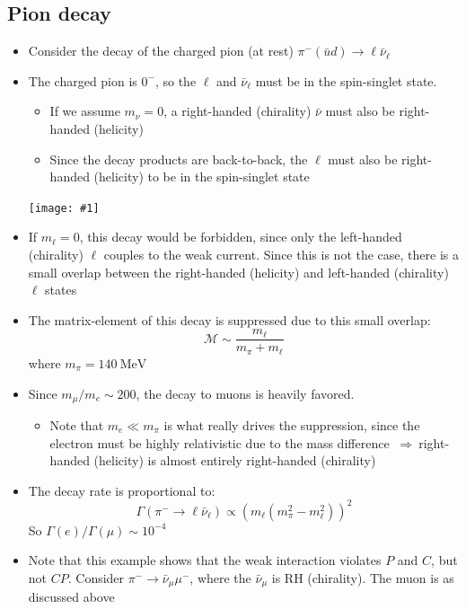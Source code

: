 \documentclass[11pt]{article}
\newcommand{\ubar}{\bar{u}}
\newcommand{\nubar}{{\bar{\nu}}}
\newcommand{\Mme}{\mathcal{M}}
\newcommand{\mev}{\text{MeV}}
\newcommand{\thus}{$~\Rightarrow~$}
\newcommand{\embedimgw}[2]{\begin{center}\texttt{[image: \#1]}\end{center}}
\begin{document}
\subsection{Pion decay}
\begin{itemize}
  \item Consider the decay of the charged pion (at rest) $\pi^-(\ubar d)\rightarrow \ell \nubar_\ell$
  \item The charged pion is $0^-$, so the $\ell$ and $\nubar_\ell$ must be in the spin-singlet state. 
  \begin{itemize}
    \item If we assume $m_\nu = 0$, a right-handed (chirality) $\nubar$ must also be right-handed (helicity)
    \item Since the decay products are back-to-back, the $\ell$ must also be right-handed (helicity) to be in the spin-singlet state
  \end{itemize}
  \embedimgw{figs/piondecay.png}{.6}
  \item If $m_\ell = 0$, this decay would be forbidden, since only the left-handed (chirality) $\ell$ couples to the weak current. Since this is not the case, there is a small overlap between the right-handed (helicity) and left-handed (chirality) $\ell$ states
  \item The matrix-element of this decay is suppressed due to this small overlap:
  \begin{equation}
    \Mme \sim \frac{m_\ell}{m_\pi + m_\ell}
  \end{equation}
  where $m_\pi = 140~\mev$
  \item Since $m_\mu/m_e \sim 200$, the decay to muons is heavily favored.
  \begin{itemize}
    \item Note that $m_e \ll m_\pi$ is what really drives the suppression, since the electron must be highly relativistic due to the mass difference \thus right-handed (helicity) is almost entirely right-handed (chirality)
  \end{itemize}
  \item The decay rate is proportional to:
  \begin{equation}
    \Gamma (\pi^- \rightarrow \ell \nubar_\ell) \propto \left(m_\ell \left(m_\pi^2 - m_\ell^2\right) \right)^2
  \end{equation}
  So $\Gamma(e)/\Gamma(\mu) \sim 10^{-4}$
  \item Note that this example shows that the weak interaction violates $P$ and $C$, but not $CP$. Consider $\pi^-\rightarrow \nubar_\mu \mu^-$, where the $\nubar_\mu$ is RH (chirality). The muon is as discussed above

\end{itemize}
\end{document}
